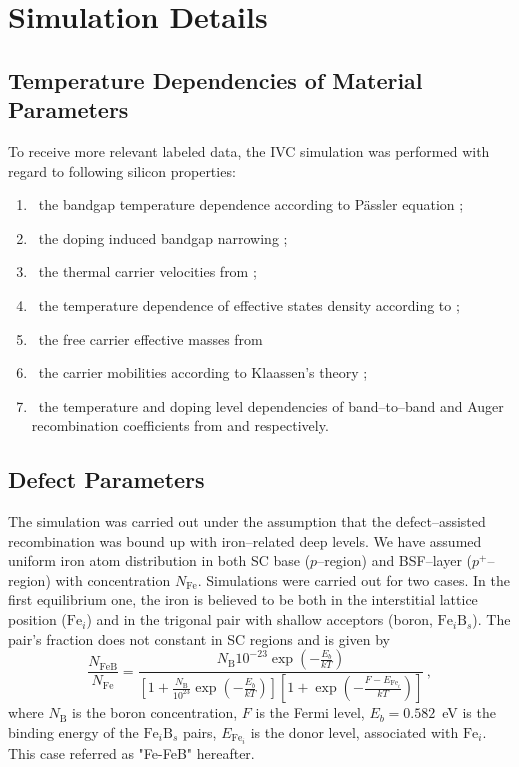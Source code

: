 \documentclass[journal]{IEEEtran}
\begin{document}
\section{Simulation Details}

\subsection{Temperature Dependencies of Material Parameters}

To receive more relevant labeled data, the IVC simulation was performed with regard to following silicon properties:
\begin{enumerate}
  \item~the bandgap temperature dependence according to P\"assler equation \cite{Pasler};
  \item~the doping induced bandgap narrowing \cite{EgNarrow};
  \item~the thermal carrier velocities from \cite{Nc:Green};
  \item~the temperature dependence of effective states density  according to \cite{Si_ni_Couderc};
  \item~the free carrier effective masses from \cite{OMara}
  \item~the carrier mobilities according to Klaassen's theory  \cite{KLAASSEN953};
  \item~the temperature and doping level dependencies of band--to--band and Auger recombination coefficients from \cite{Si_BtB} and \cite{Si_Auger} respectively.
\end{enumerate}

\subsection{Defect Parameters}

The simulation was carried out under the assumption that the defect--assisted recombination was
bound up with iron--related deep levels.
We have assumed uniform iron atom distribution in both SC base ($p$--region) and BSF--layer ($p^+$--region) with concentration $N_{\mathrm{Fe}}$.
Simulations were carried out for two cases.
In the first equilibrium one, the iron is believed to be both in the interstitial lattice position ($\mathrm{Fe}_i$) and in the trigonal pair with shallow acceptors (boron, $\mathrm{Fe}_i\mathrm{B}_s$).
The pair's fraction does not constant in SC regions and is given by \cite{MurphyJAP2011,FeB:kinetic}
\begin{equation}
\label{eqNFeB}
    \frac{N_{\mathrm{FeB}}}{N_{\mathrm{Fe}}}=\frac{N_\mathrm{B}10^{-23}\exp\left(-\frac{E_b}{kT}\right)}
     {\left[1+\frac{N_\mathrm{B}}{10^{23}}\exp\left(-\frac{E_b}{kT}\right)\right]\left[1+\exp\left(-\frac{F-E_{\mathrm{Fe}_i}}{kT}\right)\right]}\,,
\end{equation}
where
$N_\mathrm{B}$ is the boron concentration,
$F$ is the Fermi level,
$E_b=0.582$~eV is the binding energy of the $\mathrm{Fe}_i\mathrm{B}_s$ pairs,
$E_{\mathrm{Fe}_i}$ is the donor level, associated with $\mathrm{Fe}_i$.
This case referred as "Fe-FeB" hereafter.
\end{document}
